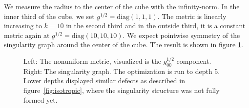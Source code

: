 \documentclass[../thesis.tex]{subfiles}
\begin{document}
We measure the radius to the center of the cube with the infinity-norm.
In the inner third of the cube, we set $g^{1/2}=\mathrm{diag}(1,1,1)$.
The metric is linearly increasing to $k=10$ in the second third
and in the outside third, it is a constant metric again at $g^{1/2}=\mathrm{diag}(10,10,10)$.
We expect pointwise symmetry of the singularity graph around the center of the cube.
The result is shown in figure \ref{fig:nonuniform}. 
\begin{figure}[htb]
    \centering
    \def\svgwidth{25em}
    
    \caption{Left: The nonuniform metric, visualized is the $g_{00}^{1/2}$ component. Right: The singularity graph.
    The optimization is run to depth 5. Lower depths displayed similar defects as described in figure~\ref{fig:isotropic}, where
    the singularity structure was not fully formed yet.}
    \label{fig:nonuniform}
\end{figure}
\end{document}

